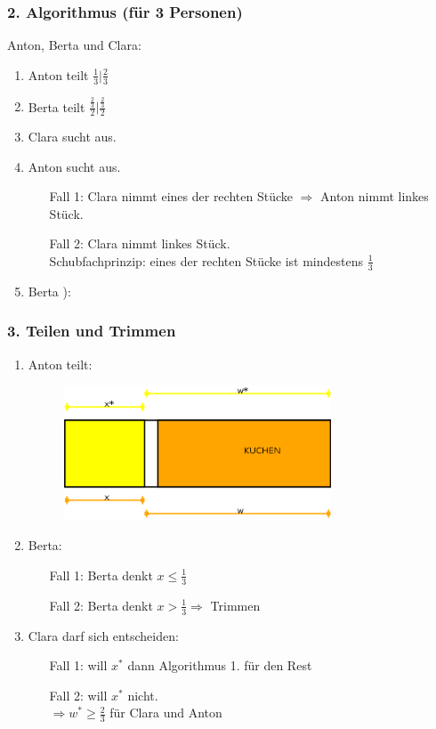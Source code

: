 \subsubsection{2. Algorithmus (für 3 Personen)}
Anton, Berta und Clara:
\begin{enumerate}
	\item Anton teilt $\frac{1}{3} | \frac{2}{3}$
	\item Berta teilt $\frac{\frac{2}{3}}{2}|\frac{\frac{2}{3}}{2}$
	\item Clara sucht aus.
	\item Anton sucht aus.
	\begin{enumerate}
		\item [Fall 1:] Clara nimmt eines der rechten Stücke $\Rightarrow$ Anton nimmt linkes Stück.
		\item [Fall 2:] Clara nimmt linkes Stück.\\ Schubfachprinzip: eines der rechten Stücke ist mindestens $\frac{1}{3}$
	\end{enumerate}
	\item Berta ):
\end{enumerate}
\subsubsection{3. Teilen und Trimmen}
\begin{enumerate}
	\item Anton teilt:
	\begin{figure}[h]
	\centering
	\includegraphics[width=300px]{../GFX/teilenundtrimmen.png}
\end{figure}
	\item Berta:
	\begin{enumerate}
		\item[Fall 1:] Berta denkt $x \leq \frac{1}{3}$
		\item[Fall 2:] Berta denkt $x > \frac{1}{3} \Rightarrow$ Trimmen
	\end{enumerate}
	\item Clara darf sich entscheiden:
		\begin{enumerate}
		\item[Fall 1:] will $x^*$ dann Algorithmus 1. für den Rest 
		\item[Fall 2:] will $x^*$ nicht.\\$\Rightarrow w^* \geq \frac{2}{3}$ für Clara und Anton\\
	\end{enumerate}
\end{enumerate}
